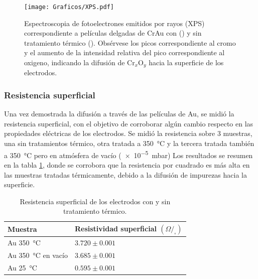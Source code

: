 {				\begin{figure}[ht!]
		 	       	\begin{center}
		 	       	\texttt{[image: Graficos/XPS.pdf]}
		        	\caption[XPS de películas delgadas de Cr\textbar Au]{Espectroscopia de fotoelectrones emitidos por rayos (XPS) correspondiente a películas delgadas de Cr\textbar Au con (\usebox{\rojo}) y sin tratamiento térmico  (\usebox{\marron}). Obsérvese los picos correspondiente al cromo y el aumento de la intensidad relativa del pico correspondiente al oxigeno, indicando la difusión de Cr$_x$O$_y$ hacia la superficie de los electrodos.}
		         	\label{fig:XPS}
		         	\end{center}
		     		\end{figure}
		
		\subsubsection{Resistencia superficial}

			Una vez demostrada la difusión a través de las películas de Au, se midió la resistencia superficial, con el objetivo de corroborar algún cambio respecto en las propiedades eléctricas de los electrodos. Se midió la resistencia sobre 3 muestras, una sin tratamientos térmico, otra tratada a \SI{350}{\celsius} y la tercera tratada también a \SI{350}{\celsius} pero en atmósfera de vacío (\SI{e-5}{\milli\bar}) Los resultados se resumen en la tabla \ref{tabla:resistencia}, donde se corrobora que la resistencia por cuadrado es más alta en las muestras tratadas térmicamente, debido a la difusión de impurezas hacia la superficie. 

				\begin{table}[ht!]
			  		  \caption[Resistencia superficial de los electrodos]{Resistencia superficial de los electrodos con y sin tratamiento térmico.} 
			  		  \begin{tabular}{>{\raggedright\arraybackslash}m{4.2cm}>{\raggedright\arraybackslash}m{7.075cm}} 
			  		  \toprule
					  Muestra & Resistividad superficial $(\Omega/_{\square})$  \\ \midrule
			      	  Au \SI{350}{\celsius} 		  	& $3.720 \pm 0.001$		 \\	  
			      	  Au \SI{350}{\celsius} en vacío	& $3.685 \pm 0.001$		 \\	  
			      	  Au \SI{25}{\celsius}    	  		& $0.595 \pm 0.001$		 \\ 
			      	  \bottomrule
			    	  \end{tabular}
			    	  \label{tabla:resistencia}
			   		  \end{table}
		
}
